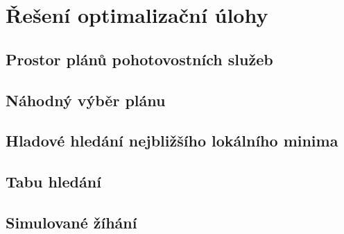 \chapter{Řešení optimalizační úlohy}

\section{Prostor plánů pohotovostních služeb}

\section{Náhodný výběr plánu}

\section{Hladové hledání nejbližšího lokálního minima}

\section{Tabu hledání}

\section{Simulované žíhání}

